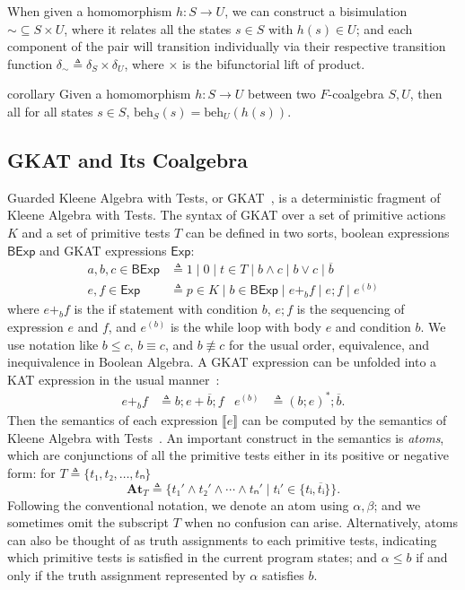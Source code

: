 \documentclass[conference]{IEEEtran}
\newcommand{\At}{\mathbf{At}}
\newcommand{\theoryOf}[1]{\ensuremath{\mathsf{#1}}}
\newcommand{\Exp}{\theoryOf{Exp}}
\newcommand{\BExp}{\theoryOf{BExp}}
\begin{document}
When given a homomorphism \(h: S → U\), we can construct a bisimulation \({∼} ⊆ S × U\), where it relates all the states \(s ∈ S\) with \(h(s) ∈ U\); and each component of the pair will transition individually via their respective transition function \(δ_∼ ≜ δ_S × δ_U\), where \(×\) is the bifunctorial lift of product.
\begin{theoremEnd}{corollary}\label{thm:hom-preserves-semantics}
    Given a homomorphism \(h: S → U\) between two \(F\)-coalgebra \(S, U\), then all for all states \(s ∈ S\), \(\mathrm{beh}_S(s) = \mathrm{beh}_U(h(s)).\)
\end{theoremEnd}

\subsection{GKAT and Its Coalgebra}

Guarded Kleene Algebra with Tests, or GKAT~\cite{smolka_GuardedKleeneAlgebra_2020}, is a deterministic fragment of Kleene Algebra with Tests. 
The syntax of GKAT over a set of primitive actions \(K\) and a set of primitive tests \(T\) can be defined in two sorts, boolean expressions \(\BExp\) and GKAT expressions \(\Exp\):
\begin{align*}
    a, b, c ∈ \BExp 
        & ≜ 1 ∣ 0 ∣ t ∈ T ∣ b ∧ c ∣ b ∨ c ∣ \overline{b} \\  
    e, f ∈ \Exp 
        & ≜ p ∈ K ∣ b ∈ \BExp ∣ e +_b f ∣ e ; f ∣ e^{(b)} 
\end{align*}
where \(e +_b f\) is the if statement with condition \(b\), \(e;f\) is the sequencing of expression \(e\) and \(f\), and \(e^{(b)}\) is the while loop with body \(e\) and condition \(b\).
We use notation like \(b ≤ c\), \(b ≡ c\), and \(b ≢ c\) for the usual order, equivalence, and inequivalence in Boolean Algebra.
A GKAT expression can be unfolded into a KAT expression in the usual manner~\cite{kozen_KleeneAlgebraTests_1997c}:
\begin{align*}
    e +_b f & ≜ b; e + \overline{b}; f &
    e^{(b)} & ≜ (b; e)^*; \overline{b}.
\end{align*}
Then the semantics of each expression \(⟦e⟧\) can be computed by the semantics of Kleene Algebra with Tests~\cite{kozen_KleeneAlgebraTests_1997c}.
An important construct in the semantics is \emph{atoms}, which are conjunctions of all the primitive tests either in its positive or negative form: for \(T ≜ \{t₁, t₂, …, tₙ\}\)
\[\At_T ≜ \{t₁' ∧ t₂' ∧ ⋯ ∧ tₙ' ∣ tᵢ' ∈ \{tᵢ, \overline{tᵢ}\}\}.\]
Following the conventional notation, we denote an atom using \(α, β\); and we sometimes omit the subscript \(T\) when no confusion can arise.
Alternatively, atoms can also be thought of as truth assignments to each primitive tests, indicating which primitive tests is satisfied in the current program states; and \(α ≤ b\) if and only if the truth assignment represented by \(α\) satisfies \(b\).
\end{document}
